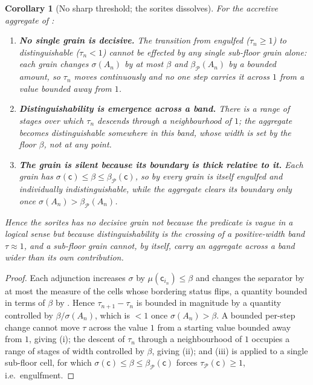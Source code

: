 \documentclass[11pt,twocolumn,a4paper]{article}
\theoremstyle{thmstyle}
\newtheorem{corollary}[theorem]{Corollary}
\theoremstyle{definition}
\theoremstyle{remark}
\newcommand{\thick}{\beta}
\newcommand{\Part}{\mathscr{P}}
\newcommand{\cell}{\mathsf{c}}
\begin{document}
\begin{corollary}[No sharp threshold; the sorites dissolves]
\label{cor:sorites}
For the accretive aggregate of :
\begin{enumerate}[label=\textup{(\roman*)},leftmargin=2.2em]
\item \textbf{No single grain is decisive.} The transition from engulfed
\textup{(}$\tau_n\ge1$\textup{)} to distinguishable \textup{(}$\tau_n<1$\textup{)}
cannot be effected by any single sub-floor grain alone: each grain changes
$\sigma(A_n)$ by at most $\thick$ and $\thick_\Part(A_n)$ by a bounded amount, so
$\tau_n$ moves continuously and no one step carries it across $1$ from a value
bounded away from $1$.
\item \textbf{Distinguishability is emergence across a band.} There is a range of
stages over which $\tau_n$ descends through a neighbourhood of $1$; the aggregate
becomes distinguishable somewhere in this band, whose width is set by the floor
$\thick$, not at any point.
\item \textbf{The grain is silent because its boundary is thick relative to it.}
Each grain has $\sigma(\cell)\le\thick\le\thick_\Part(\cell)$, so by
 every grain is itself engulfed and individually
indistinguishable, while the aggregate clears its boundary only once
$\sigma(A_n)>\thick_\Part(A_n)$.
\end{enumerate}
Hence the sorites has no decisive grain not because the predicate is vague in a
logical sense but because distinguishability is the crossing of a positive-width
band $\tau\approx1$, and a sub-floor grain cannot, by itself, carry an aggregate
across a band wider than its own contribution.
\end{corollary}

\begin{proof}
Each adjunction increases $\sigma$ by $\mu(\cell_{i_n})\le\thick$ and changes the
separator by at most the measure of the cells whose bordering status flips, a
quantity bounded in terms of $\thick$ by . Hence
$\tau_{n+1}-\tau_n$ is bounded in magnitude by a quantity controlled by
$\thick/\sigma(A_n)$, which is $<1$ once $\sigma(A_n)>\thick$. A bounded
per-step change cannot move $\tau$ across the value $1$ from a starting value
bounded away from $1$, giving (i); the descent of $\tau_n$ through a
neighbourhood of $1$ occupies a range of stages of width controlled by $\thick$,
giving (ii); and (iii) is  applied to a single
sub-floor cell, for which $\sigma(\cell)\le\thick\le\thick_\Part(\cell)$ forces
$\tau_\Part(\cell)\ge1$, i.e.\ engulfment.
\end{proof}
\end{document}
